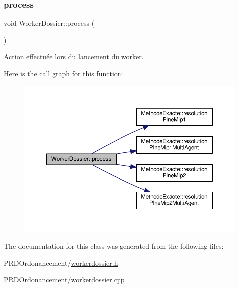 \subsubsection{\texorpdfstring{process}{process}}
{\footnotesize\ttfamily void Worker\+Dossier\+::process (\begin{DoxyParamCaption}{ }\end{DoxyParamCaption})\hspace{0.3cm}{\ttfamily [slot]}}



Action effectuée lors du lancement du worker. 

Here is the call graph for this function\+:\nopagebreak
\begin{figure}[H]
\begin{center}
\leavevmode
\includegraphics[width=350pt]{classWorkerDossier_a2e2970df6c43c669eb730a858a780a31_cgraph}
\end{center}
\end{figure}


The documentation for this class was generated from the following files\+:\begin{DoxyCompactItemize}
\item 
P\+R\+D\+Ordonancement/\hyperlink{workerdossier_8h}{workerdossier.\+h}\item 
P\+R\+D\+Ordonancement/\hyperlink{workerdossier_8cpp}{workerdossier.\+cpp}\end{DoxyCompactItemize}
